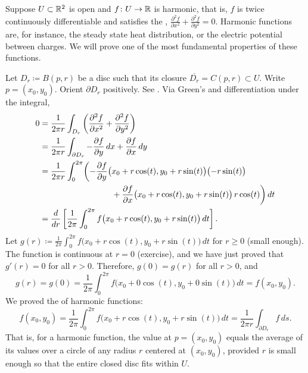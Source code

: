 \begin{example}
Suppose $U \subset {\mathbb{R}}^2$ is open and
$f \colon U \to {\mathbb{R}}$ is harmonic, that is, $f$ is twice continuously
differentiable and
satisfies the \emph{},
$\frac{\partial^2 f}{\partial x^2} +
\frac{\partial^2 f}{\partial y^2} = 0$.
Harmonic functions are, for instance, the steady state heat distribution,
or the electric potential between charges.
We will prove one of the most fundamental properties of these functions.

Let $D_r \coloneqq B(p,r)$ be a disc such that its closure $\overline{D_r} = C(p,r) \subset U$.  Write
$p = (x_0,y_0)$.  Orient
$\partial D_r$ positively.  See .
Via Green's and differentiation under the integral,
\begin{equation*}
\begin{split}
0
& =
\frac{1}{2\pi r}
\int_{D_r}
\left(
\frac{\partial^2 f}{\partial x^2} +
\frac{\partial^2 f}{\partial y^2}
\right)
\\
& 
=
\frac{1}{2\pi r}
\int_{\partial D_r}
- \frac{\partial f}{\partial y} \, dx + 
\frac{\partial f}{\partial x} \, dy
\\
&
=
\frac{1}{2\pi r}
\int_0^{2\pi}
\biggl(
- \frac{\partial f}{\partial y} \bigl(x_0+r\cos(t),y_0+r\sin(t)\bigr) \bigl(-r\sin(t)\bigr)
\\
& \hspace{1.2in}
+ \frac{\partial f}{\partial x} \bigl(x_0+r\cos(t),y_0+r\sin(t)\bigr) \, r\cos(t)
\biggr) \, dt
\\
&
=
\frac{d}{dr}
\left[
\frac{1}{2\pi}
\int_0^{2\pi}
f\bigl(x_0+r\cos(t),y_0+r\sin(t)\bigr) \, dt
\right] .
\end{split}
\end{equation*}
Let $g(r) \coloneqq 
\frac{1}{2\pi}
\int_0^{2\pi}
f\bigl(x_0+r\cos(t),y_0+r\sin(t)\bigr) \, dt$ for $r \geq 0$ (small enough).
The function is continuous at $r=0$ (exercise), and we have just proved that
$g'(r) = 0$ for all $r > 0$.
Therefore, $g(0) = g(r)$ for all $r > 0$, and
\begin{equation*}
g(r) = g(0) = 
\frac{1}{2\pi}
\int_0^{2\pi}
f\bigl(x_0+0\cos(t),y_0+0\sin(t)\bigr) \, dt
=
f(x_0,y_0).
\end{equation*}
We
proved the \emph{} of harmonic functions:
\begin{equation*}
f(x_0,y_0) = 
\frac{1}{2\pi}
\int_0^{2\pi}
f\bigl(x_0+r\cos(t),y_0+r\sin(t)\bigr) \, dt 
=
\frac{1}{2\pi r}
\int_{\partial D_r} f \, ds .
\end{equation*}
That is, for a harmonic function, the value at $p = (x_0,y_0)$ equals the average
of its values
over a circle of any radius $r$ centered at $(x_0,y_0)$,
provided $r$ is small enough so that the entire closed disc fits within $U$.
\end{example}

